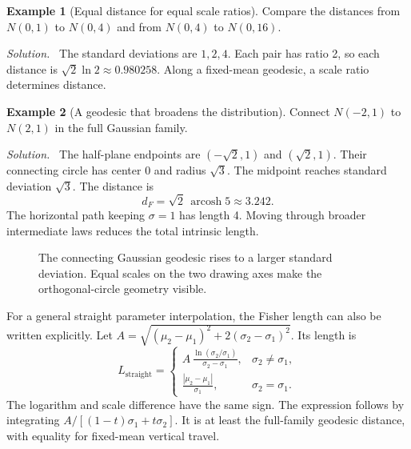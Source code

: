 \documentclass[11pt,oneside,openany]{book}
\theoremstyle{definition}
\newtheorem{example}{Example}[chapter]
\theoremstyle{remark}
\newenvironment{solution}{\par\smallskip\noindent\textit{Solution.}\ }{\par\smallskip}
\newcommand{\arcosh}{\operatorname{arcosh}}
\numberwithin{equation}{chapter}
\begin{document}
\begin{example}[Equal distance for equal scale ratios]
Compare the distances from $N(0,1)$ to $N(0,4)$ and from $N(0,4)$ to $N(0,16)$.
\begin{solution}
The standard deviations are $1,2,4$. Each pair has ratio 2, so each distance is $\sqrt2\ln2\approx0.980258$. Along a fixed-mean geodesic, a scale ratio determines distance.
\end{solution}
\end{example}

\begin{example}[A geodesic that broadens the distribution]
Connect $N(-2,1)$ to $N(2,1)$ in the full Gaussian family.
\begin{solution}
The half-plane endpoints are $(-\sqrt2,1)$ and $(\sqrt2,1)$. Their connecting circle has center 0 and radius $\sqrt3$. The midpoint reaches standard deviation $\sqrt3$. The distance is
\[
d_F=\sqrt2\,\arcosh5\approx3.242.
\]
The horizontal path keeping $\sigma=1$ has length 4. Moving through broader intermediate laws reduces the total intrinsic length.
\end{solution}
\end{example}

\begin{figure}[htbp]
\centering
{}
\caption{The connecting Gaussian geodesic rises to a larger standard deviation. Equal scales on the two drawing axes make the orthogonal-circle geometry visible.}
\end{figure}

For a general straight parameter interpolation, the Fisher length can also be written explicitly. Let $A=\sqrt{(\mu_2-\mu_1)^2+2(\sigma_2-\sigma_1)^2}$. Its length is
\begin{equation}\label{eq:gaussianstraightlength}
L_{\mathrm{straight}}=
\begin{cases}
\displaystyle A\,\frac{\ln(\sigma_2/\sigma_1)}{\sigma_2-\sigma_1},&\sigma_2\ne\sigma_1,\\[7pt]
\displaystyle\frac{|\mu_2-\mu_1|}{\sigma_1},&\sigma_2=\sigma_1.
\end{cases}
\end{equation}
The logarithm and scale difference have the same sign. The expression follows by integrating $A/[(1-t)\sigma_1+t\sigma_2]$. It is at least the full-family geodesic distance, with equality for fixed-mean vertical travel.
\end{document}
